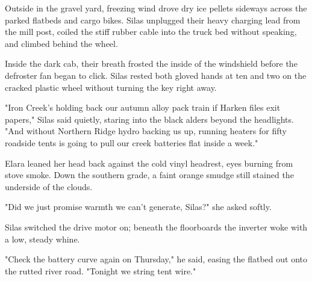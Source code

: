 Outside in the gravel yard, freezing wind drove dry ice pellets sideways across the parked flatbeds and cargo bikes. Silas unplugged their heavy charging lead from the mill post, coiled the stiff rubber cable into the truck bed without speaking, and climbed behind the wheel.

Inside the dark cab, their breath frosted the inside of the windshield before the defroster fan began to click. Silas rested both gloved hands at ten and two on the cracked plastic wheel without turning the key right away.

"Iron Creek's holding back our autumn alloy pack train if Harken files exit papers," Silas said quietly, staring into the black alders beyond the headlights. "And without Northern Ridge hydro backing us up, running heaters for fifty roadside tents is going to pull our creek batteries flat inside a week."

Elara leaned her head back against the cold vinyl headrest, eyes burning from stove smoke. Down the southern grade, a faint orange smudge still stained the underside of the clouds.

"Did we just promise warmth we can't generate, Silas?" she asked softly.

Silas switched the drive motor on; beneath the floorboards the inverter woke with a low, steady whine.

"Check the battery curve again on Thursday," he said, easing the flatbed out onto the rutted river road. "Tonight we string tent wire."

